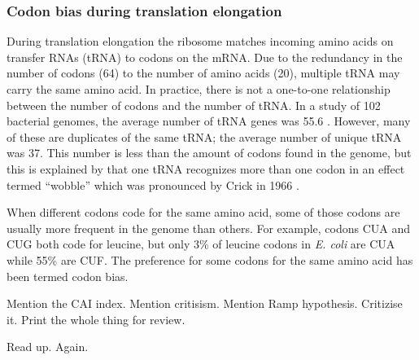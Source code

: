 \subsubsection{Codon bias during translation elongation}
During translation elongation the ribosome matches incoming amino acids on
transfer RNAs (tRNA) to codons on the mRNA. Due to the redundancy in the number
of codons (64) to the number of amino acids (20), multiple tRNA may carry
the same amino acid. In practice, there is not a one-to-one relationship
between the number of codons and the number of tRNA. In a study of 102
bacterial genomes, the average number of tRNA genes was 55.6
\cite{rocha_codon_2004}. However, many of these are duplicates of the same
tRNA; the average number of unique tRNA was 37. This number is less than the
amount of codons found in the genome, but this is explained by that one tRNA
recognizes more than one codon in an effect termed ``wobble'' which was
pronounced by Crick in 1966 \cite{crick_codon--anticodon_1966}.

When different codons code for the same amino acid, some of those codons are
usually more frequent in the genome than others. For example, codons CUA and
CUG both code for leucine, but only 3\% of leucine codons in \textit{E. coli}
are CUA while 55\% are CUF. The preference for some codons for the same amino
acid has been termed codon bias.

Mention the CAI index. Mention critisism. Mention Ramp hypothesis. Critizise
it. Print the whole thing for review.

Read up. Again.

